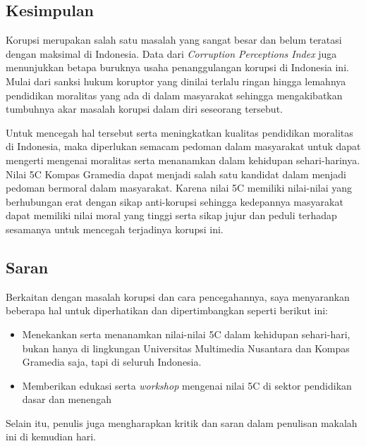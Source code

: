 \documentclass[11pt]{article}
\begin{document}
    \subsection{Kesimpulan}
    Korupsi merupakan salah satu masalah yang sangat besar dan belum teratasi
    dengan maksimal di Indonesia. Data dari \emph{Corruption Perceptions Index}
    juga menunjukkan betapa buruknya usaha penanggulangan korupsi di Indonesia ini.
    Mulai dari sanksi hukum koruptor yang dinilai terlalu ringan hingga lemahnya
    pendidikan moralitas yang ada di dalam masyarakat sehingga mengakibatkan tumbuhnya
    akar masalah korupsi dalam diri seseorang tersebut. 

    Untuk mencegah hal tersebut serta meningkatkan kualitas pendidikan moralitas
    di Indonesia, maka diperlukan semacam pedoman dalam masyarakat untuk dapat 
    mengerti mengenai moralitas serta menanamkan dalam kehidupan sehari-harinya.
    Nilai 5C Kompas Gramedia dapat menjadi salah satu kandidat dalam menjadi pedoman
    bermoral dalam masyarakat. Karena nilai 5C memiliki nilai-nilai yang berhubungan
    erat dengan sikap anti-korupsi sehingga kedepannya masyarakat dapat memiliki
    nilai moral yang tinggi serta sikap jujur dan peduli terhadap sesamanya untuk
    mencegah terjadinya korupsi ini. 
    
    \subsection{Saran}
    Berkaitan dengan masalah korupsi dan cara pencegahannya, saya menyarankan beberapa
    hal untuk diperhatikan dan dipertimbangkan seperti berikut ini:
    \begin{itemize}
        \item Menekankan serta menanamkan nilai-nilai 5C dalam kehidupan sehari-hari,
              bukan hanya di lingkungan Universitas Multimedia Nusantara dan Kompas
              Gramedia saja, tapi di seluruh Indonesia.
        \item Memberikan edukasi serta \emph{workshop} mengenai nilai 5C di sektor
              pendidikan dasar dan menengah 
    \end{itemize}
    Selain itu, penulis juga mengharapkan kritik dan saran dalam penulisan makalah 
    ini di kemudian hari.

\newpage
\nocite{agerbergCurseKnowledgeEducation2019, alaidrusTransparansiMinimKepentingan, badanpusatpengembangandanpembinaanbahasaKorupsi, demsetzTheoryPropertyRights1974, dwiputriantiMEMAHAMISTRATEGIPEMBERANTASAN, firdausiJatuhBangunLembaga2017, izzudinAlasanKenapaKorupsi, jainCorruptionReview2001, javierICWAngkaPenindakan2021, laportaQualityGovernment1999, lipsetPoliticalManSocial1960, okezoneKetuaKPKKorupsi2020, paolomauroEconomicIssuesNo1997, purwadarmintaKamusUmumBahasa1982, saputriKenapaHukumanKoruptor2015, setiadiKORUPSIDIINDONESIA2018, shleiferCorruption1993, suparmo2016transformasi, svenssonEightQuestionsCorruption2005, syariefKorupsiKolektifKorupsi2018, transparencyinternationalCorruptionPerceptionsIndex2020, transparencyinternationalGrandCorruptionOur, vanderbrugErosionPoliticalTrust2007}


\end{document}
